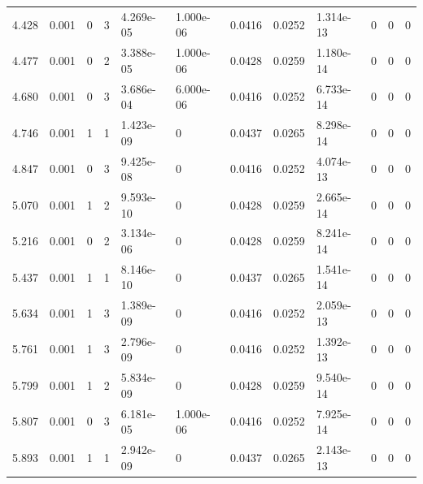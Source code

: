 \documentclass[preview]{standalone}
\begin{document}
{{\begin{tabular}{L{1.2cm}C{1.2cm} C{0.3cm}C{0.5cm} C{1.4cm}C{1.4cm} C{1.4cm}C{1.4cm} C{1.6cm}C{1.6cm} C{1.6cm}C{1.6cm}}
  4.428  &  0.001  & 0     &  3 &  4.269e-05  & 1.000e-06  &  0.0416&   0.0252& 1.314e-13 & 0   &  0 & 0  \\ 
  4.477  &  0.001  & 0     &  2 &  3.388e-05  & 1.000e-06  &  0.0428&   0.0259& 1.180e-14 & 0   &  0 & 0  \\ 
  4.680  &  0.001  & 0     &  3 &  3.686e-04  & 6.000e-06  &  0.0416&   0.0252& 6.733e-14 & 0   &  0 & 0  \\ 
  4.746  &  0.001  & 1     &  1 &  1.423e-09  & 0  &  0.0437&   0.0265& 8.298e-14 & 0   &  0 & 0  \\ 
  4.847  &  0.001  & 0     &  3 &  9.425e-08  & 0  &  0.0416&   0.0252& 4.074e-13 & 0   &  0 & 0  \\ 
  5.070  &  0.001  & 1     &  2 &  9.593e-10  & 0  &  0.0428&   0.0259& 2.665e-14 & 0   &  0 & 0  \\ 
  5.216  &  0.001  & 0     &  2 &  3.134e-06  & 0  &  0.0428&   0.0259& 8.241e-14 & 0   &  0 & 0  \\ 
  5.437  &  0.001  & 1     &  1 &  8.146e-10  & 0  &  0.0437&   0.0265& 1.541e-14 & 0   &  0 & 0  \\ 
  5.634  &  0.001  & 1     &  3 &  1.389e-09  & 0  &  0.0416&   0.0252& 2.059e-13 & 0   &  0 & 0  \\ 
  5.761  &  0.001  & 1     &  3 &  2.796e-09  & 0  &  0.0416&   0.0252& 1.392e-13 & 0   &  0 & 0  \\ 
  5.799  &  0.001  & 1     &  2 &  5.834e-09  & 0  &  0.0428&   0.0259& 9.540e-14 & 0   &  0 & 0  \\ 
  5.807  &  0.001  & 0     &  3 &  6.181e-05  & 1.000e-06  &  0.0416&   0.0252& 7.925e-14 & 0   &  0 & 0  \\ 
  5.893  &  0.001  & 1     &  1 &  2.942e-09  & 0  &  0.0437&   0.0265& 2.143e-13 & 0   &  0 & 0  \\ 
\hline 
\end{tabular} 

}}
\end{document}
